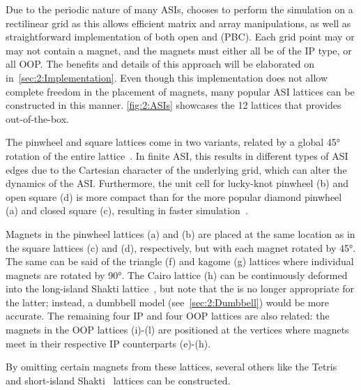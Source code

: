 Due to the periodic nature of many ASIs, \hotspice chooses to perform the simulation on a rectilinear grid as this allows efficient matrix and array manipulations, as well as straightforward implementation of both open and  (PBC).
Each grid point may or may not contain a magnet, and the magnets must either all be of the IP type, or all OOP.
The benefits and details of this approach will be elaborated on in~\cref{sec:2:Implementation}.
Even though this implementation does not allow complete freedom in the placement of magnets, many popular ASI lattices can be constructed in this manner.
\cref{fig:2:ASIs} showcases the 12 lattices that \hotspice provides out-of-the-box. \par
The pinwheel and square lattices come in two variants, related by a global \ang{45} rotation of the entire lattice~\cite{ApparentFMpinwheel}.
In finite ASI, this results in different types of ASI edges due to the Cartesian character of the underlying grid, which can alter the dynamics of the ASI.
Furthermore, the unit cell for lucky-knot pinwheel (b) and open square (d) is more compact than for the more popular diamond pinwheel (a) and closed square (c), resulting in faster simulation~\cite{AdvancesASI}. \par %
Magnets in the pinwheel lattices (a) and (b) are placed at the same location as in the square lattices (c) and (d), respectively, but with each magnet rotated by \ang{45}.
The same can be said of the triangle (f) and kagome (g) lattices where individual magnets are rotated by \ang{90}.
The Cairo lattice (h) can be continuously deformed into the long-island Shakti lattice~\cite{ShaktiCairo,ShaktiCairoSquare}, but note that the  is no longer appropriate for the latter; instead, a dumbbell model (see~\cref{sec:2:Dumbbell}) would be more accurate.
The remaining four IP and four OOP lattices are also related: the magnets in the OOP lattices (i)-(l) are positioned at the vertices where magnets meet in their respective IP counterparts (e)-(h). \par
By omitting certain magnets from these lattices, several others like the Tetris~\cite{Saglam2022Tetris,nisoli2018topologytetris} and short-island Shakti~\cite{gilbert2014emergent} lattices can be constructed.


